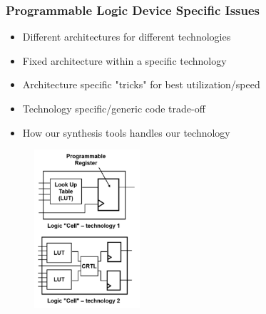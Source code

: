 \documentclass[t, notes, xcolor=table]{beamer}
\begin{document}
\begin{frame}
\frametitle{Programmable Logic Device Specific Issues}
\scriptsize{
\begin{multicols}{2}
\begin{itemize}
\item Different architectures for different technologies
\item Fixed architecture within a specific technology
\item Architecture specific "tricks" for best utilization/speed
\item Technology specific/generic code trade-off
\item How our synthesis tools handles our technology
\end{itemize}
\vfill
\columnbreak
\begin{figure}
    \includegraphics[width=0.35\textwidth]{img/12_programmable_issues.png}
\end{figure}
\end{multicols}
}
\end{frame}
\end{document}
